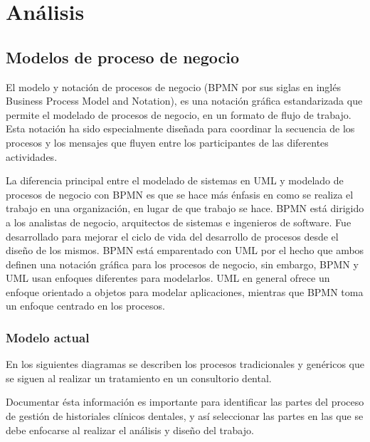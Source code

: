 \newpage
\section{Análisis}

\subsection{Modelos de proceso de negocio}

El modelo y notación de procesos de negocio (BPMN por sus siglas en inglés Business Process Model and Notation), es una notación gráfica estandarizada que permite el modelado de procesos de negocio, en un formato de flujo de trabajo. Esta notación ha sido especialmente diseñada para coordinar la secuencia de los procesos y los mensajes que fluyen entre los participantes de las diferentes actividades.

\vspace{1em}

La diferencia principal entre el modelado de sistemas en UML y modelado de procesos de negocio con BPMN es que se hace más énfasis en como se realiza el trabajo en una organización, en lugar de que trabajo se hace. BPMN está dirigido a los analistas de negocio, arquitectos de sistemas e ingenieros de software. Fue desarrollado para mejorar el ciclo de vida del desarrollo de procesos desde el diseño de los mismos. BPMN está emparentado con UML por el hecho que ambos definen una notación gráfica para los procesos de negocio, sin embargo, BPMN y UML usan enfoques diferentes para modelarlos. UML en general ofrece un enfoque orientado a objetos para modelar aplicaciones, mientras que BPMN toma un enfoque centrado en los procesos.

\subsubsection{Modelo actual}

En los siguientes diagramas se describen los procesos tradicionales y genéricos que se siguen al realizar un tratamiento en un consultorio dental.

\vspace{1em}

Documentar ésta información es importante para identificar las partes del proceso de gestión de historiales clínicos dentales, y así seleccionar las partes en las que se debe enfocarse al realizar el análisis y diseño del trabajo.

\vspace{1em}

